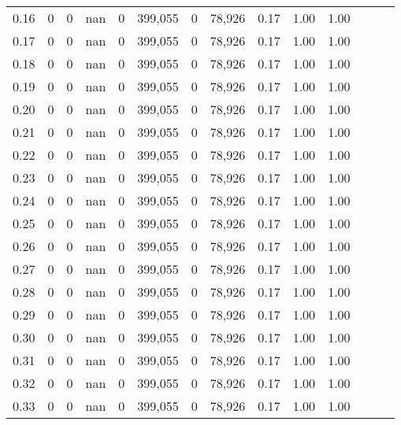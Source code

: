 \begin{tabular}{rrrrrrrrrrrrrr}
0.16 &        0 &       0 &   nan &        0 &  399,055 &       0 &  78,926 &  0.17 &  1.00 &      1.00 \\
0.17 &        0 &       0 &   nan &        0 &  399,055 &       0 &  78,926 &  0.17 &  1.00 &      1.00 \\
0.18 &        0 &       0 &   nan &        0 &  399,055 &       0 &  78,926 &  0.17 &  1.00 &      1.00 \\
0.19 &        0 &       0 &   nan &        0 &  399,055 &       0 &  78,926 &  0.17 &  1.00 &      1.00 \\
0.20 &        0 &       0 &   nan &        0 &  399,055 &       0 &  78,926 &  0.17 &  1.00 &      1.00 \\
0.21 &        0 &       0 &   nan &        0 &  399,055 &       0 &  78,926 &  0.17 &  1.00 &      1.00 \\
0.22 &        0 &       0 &   nan &        0 &  399,055 &       0 &  78,926 &  0.17 &  1.00 &      1.00 \\
0.23 &        0 &       0 &   nan &        0 &  399,055 &       0 &  78,926 &  0.17 &  1.00 &      1.00 \\
0.24 &        0 &       0 &   nan &        0 &  399,055 &       0 &  78,926 &  0.17 &  1.00 &      1.00 \\
0.25 &        0 &       0 &   nan &        0 &  399,055 &       0 &  78,926 &  0.17 &  1.00 &      1.00 \\
0.26 &        0 &       0 &   nan &        0 &  399,055 &       0 &  78,926 &  0.17 &  1.00 &      1.00 \\
0.27 &        0 &       0 &   nan &        0 &  399,055 &       0 &  78,926 &  0.17 &  1.00 &      1.00 \\
0.28 &        0 &       0 &   nan &        0 &  399,055 &       0 &  78,926 &  0.17 &  1.00 &      1.00 \\
0.29 &        0 &       0 &   nan &        0 &  399,055 &       0 &  78,926 &  0.17 &  1.00 &      1.00 \\
0.30 &        0 &       0 &   nan &        0 &  399,055 &       0 &  78,926 &  0.17 &  1.00 &      1.00 \\
0.31 &        0 &       0 &   nan &        0 &  399,055 &       0 &  78,926 &  0.17 &  1.00 &      1.00 \\
0.32 &        0 &       0 &   nan &        0 &  399,055 &       0 &  78,926 &  0.17 &  1.00 &      1.00 \\
0.33 &        0 &       0 &   nan &        0 &  399,055 &       0 &  78,926 &  0.17 &  1.00 &      1.00 \\

\end{tabular}
